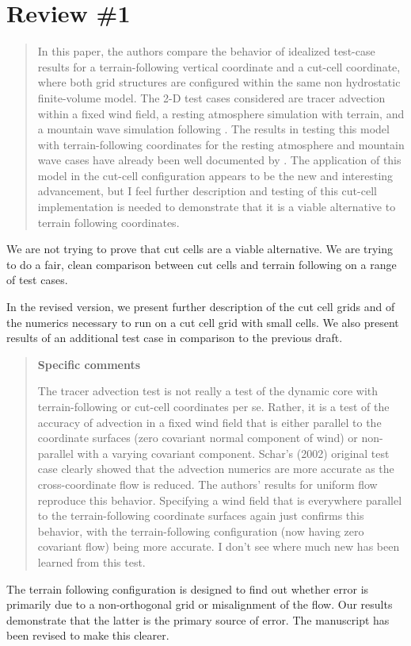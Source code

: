 \documentclass{article}
\begin{document}
\section*{Review \#1}
\begin{quotation}
In this paper, the authors compare the behavior of idealized
test-case results for a terrain-following vertical coordinate and a
cut-cell coordinate, where both grid structures are configured within
the same non hydrostatic finite-volume model. The 2-D test cases
considered are tracer advection within a fixed wind field, a resting
atmosphere simulation with terrain, and a mountain wave simulation
following \citet{schaer2002}. The  results in testing this model
with terrain-following coordinates for the resting atmosphere and
mountain wave cases have already been well documented by \citet{weller-shahrokhi2014}. The application of this model in the cut-cell
configuration appears to be the new and interesting advancement, but
I feel further description and testing of this cut-cell
implementation is needed to demonstrate that it is a viable
alternative to terrain following coordinates.
\end{quotation}
We are not trying to prove that cut cells are a viable alternative. We are trying to do a fair, clean comparison between cut cells and terrain following on a range of test cases. 

In the revised version, we present further description of the cut cell grids and of the numerics necessary to run on a cut cell grid with small cells. We also present results of an additional test case in comparison to the previous draft. 

\begin{quotation}
\noindent
\textbf{Specific comments}

The tracer advection test is not really a test of the dynamic core
with terrain-following or cut-cell coordinates per se. Rather, it is
a test of the accuracy of advection in a fixed wind field that is
either parallel to the coordinate surfaces (zero covariant normal
component of wind) or non-parallel with a varying covariant
component. Schar's (2002) original test case clearly showed that the
advection numerics are more accurate as the cross-coordinate flow is
reduced. The authors' results for uniform flow reproduce this
behavior. Specifying a wind field that is everywhere parallel to the
terrain-following coordinate surfaces again just confirms this
behavior, with the terrain-following configuration (now having zero
covariant flow) being more accurate. I don't see where much new has
been learned from this test.
\end{quotation}
The terrain following configuration is designed to find out whether
error is primarily due to a non-orthogonal grid or misalignment of the
flow.  Our results demonstrate that the latter is the primary source of
error.  The manuscript has been revised to make this clearer.
\end{document}
